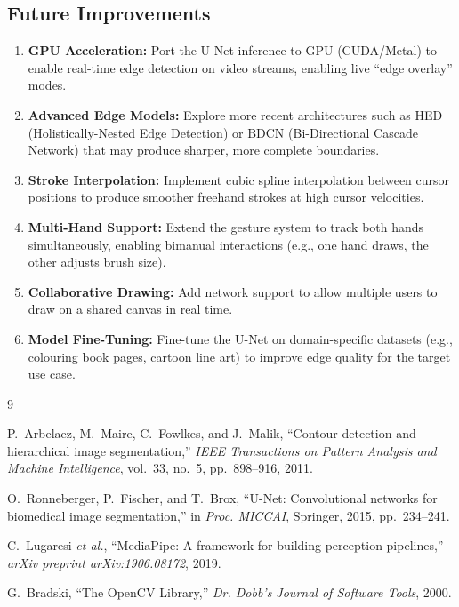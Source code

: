 \documentclass[12pt, a4paper]{article}
\begin{document}
\subsection{Future Improvements}

\begin{enumerate}[nosep]
    \item \textbf{GPU Acceleration:} Port the U-Net inference to GPU (CUDA/Metal) to enable real-time edge detection on video streams, enabling live ``edge overlay'' modes.

    \item \textbf{Advanced Edge Models:} Explore more recent architectures such as HED (Holistically-Nested Edge Detection) or BDCN (Bi-Directional Cascade Network) that may produce sharper, more complete boundaries.

    \item \textbf{Stroke Interpolation:} Implement cubic spline interpolation between cursor positions to produce smoother freehand strokes at high cursor velocities.

    \item \textbf{Multi-Hand Support:} Extend the gesture system to track both hands simultaneously, enabling bimanual interactions (e.g., one hand draws, the other adjusts brush size).

    \item \textbf{Collaborative Drawing:} Add network support to allow multiple users to draw on a shared canvas in real time.

    \item \textbf{Model Fine-Tuning:} Fine-tune the U-Net on domain-specific datasets (e.g., colouring book pages, cartoon line art) to improve edge quality for the target use case.
\end{enumerate}

\begin{thebibliography}{9}

P.~Arbelaez, M.~Maire, C.~Fowlkes, and J.~Malik,
``Contour detection and hierarchical image segmentation,''
\textit{IEEE Transactions on Pattern Analysis and Machine Intelligence},
vol.~33, no.~5, pp.~898--916, 2011.

O.~Ronneberger, P.~Fischer, and T.~Brox,
``U-Net: Convolutional networks for biomedical image segmentation,''
in \textit{Proc. MICCAI}, Springer, 2015, pp.~234--241.

C.~Lugaresi \textit{et al.},
``MediaPipe: A framework for building perception pipelines,''
\textit{arXiv preprint arXiv:1906.08172}, 2019.

G.~Bradski,
``The OpenCV Library,''
\textit{Dr. Dobb's Journal of Software Tools}, 2000.

\end{thebibliography}
\end{document}
